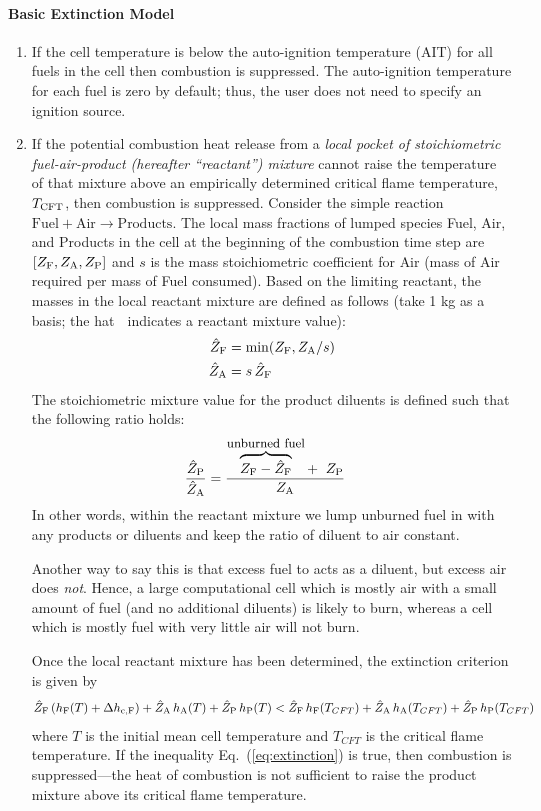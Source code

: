 \paragraph{Basic Extinction Model}
\begin{enumerate}
\item If the cell temperature is below the auto-ignition temperature (AIT) for all fuels in the cell then combustion is suppressed. The auto-ignition temperature for each fuel is zero by default; thus, the user does not need to specify an ignition source.
\item If the potential combustion heat release from a \emph{local pocket of stoichiometric fuel-air-product (hereafter ``reactant'') mixture} cannot raise the temperature of that mixture above an empirically determined critical flame temperature, $T_{\rm CFT}$, then combustion is suppressed.  Consider the simple reaction $\mbox{Fuel} + \mbox{Air} \rightarrow \mbox{Products}$. The local mass fractions of lumped species Fuel, Air, and Products in the cell at the beginning of the combustion time step are $[Z_{\rm F}, Z_{\rm A}, Z_{\rm P}]$ and $s$ is the mass stoichiometric coefficient for Air (mass of Air required per mass of Fuel consumed). Based on the limiting reactant, the masses in the local reactant mixture are defined as follows (take 1 kg as a basis; the hat $\hat{\;}$ indicates a reactant mixture value):
\begin{align}
\label{eq:dzf} \hat{Z}_{\rm F} &= \min(Z_{\rm F},Z_{\rm A}/s) \\
\label{eq:dza} \hat{Z}_{\rm A} &= s \, \hat{Z}_{\rm F}         
\end{align}
The stoichiometric mixture value for the product diluents is defined such that the following ratio holds:
\begin{align}
\label{eq:dzp} \frac{\hat{Z}_{\rm P}}{\hat{Z}_{\rm A}} &= \frac{\overbrace{Z_{\rm F} - \hat{Z}_{\rm F}}^{\mbox{\small unburned fuel}} + \;\; Z_{\rm P}}{Z_{\rm A}}
\end{align}
In other words, within the reactant mixture we lump unburned fuel in with any products or diluents and keep the ratio of diluent to air constant.

Another way to say this is that excess fuel to acts as a diluent, but excess air does \emph{not}.  Hence, a large computational cell which is mostly air with a small amount of fuel (and no additional diluents) is likely to burn, whereas a cell which is mostly fuel with very little air will not burn.

Once the local reactant mixture has been determined, the extinction criterion is given by
\begin{align}
\label{eq:extinction}
\hat{Z}_{\rm F} \, (h_{\rm F}(T) + \Delta h_{\rm c,F}) + \hat{Z}_{\rm A} \, h_{\rm A}(T) + \hat{Z}_{\rm P} \, h_{\rm P}(T) < 
\hat{Z}_{\rm F} \, h_{\rm F}(T_{CFT}) + \hat{Z}_{\rm A} \, h_{\rm A}(T_{CFT}) + \hat{Z}_{\rm P} \, h_{\rm P}(T_{CFT})
\end{align}
where $T$ is the initial mean cell temperature and $T_{CFT}$ is the critical flame temperature. If the inequality Eq.~(\ref{eq:extinction}) is true, then combustion is suppressed---the heat of combustion is not sufficient to raise the product mixture above its critical flame temperature.


\end{enumerate}
